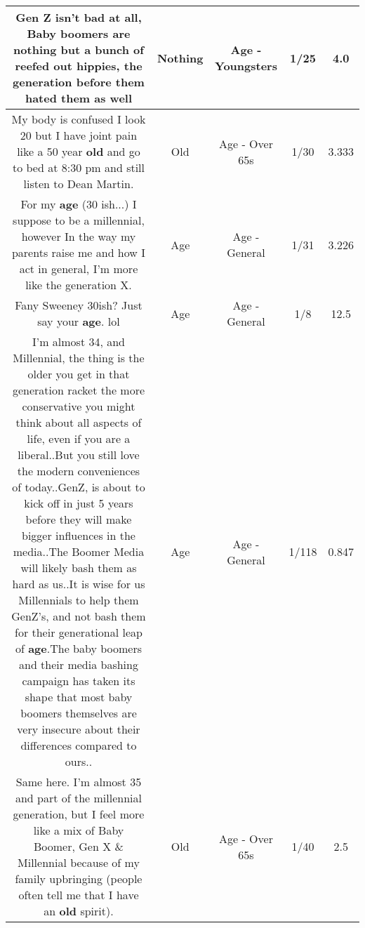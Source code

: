 \documentclass[11pt]{article}
\newlength\mylength
\begin{document}
\begin{center}
\begin{longtable}{|C{.65\mylength}|C{.30\mylength}|C{.12\mylength}|C{.12\mylength}|C{.12\mylength}|}
  \small Gen Z isn't bad at all, Baby boomers are \textbf{nothing} but a bunch of reefed out hippies, the generation before them hated them as well\normalsize   & Nothing & Age - Youngsters & 1/25 & 4.0 \\  \hline
  \small My body is confused I look 20 but I have joint pain like a 50 year \textbf{old} and go to bed at 8:30 pm and still listen to Dean Martin.\normalsize   & Old & Age - Over 65s & 1/30 & 3.333 \\  \hline
  \small For my \textbf{age} (30 ish...) I suppose to be a millennial, however In the way my parents raise me and how I act in general, I'm more like the generation X.\normalsize   & Age & Age - General & 1/31 & 3.226 \\  \hline
  \small Fany Sweeney 30ish? Just say your \textbf{age}. lol\normalsize   & Age & Age - General & 1/8 & 12.5 \\  \hline
  \small I'm almost 34, and Millennial, the thing is the older you get in that generation racket the more conservative you might think about all aspects of life, even if you are a liberal..But you still love the modern conveniences of today..GenZ, is about to kick off in just 5 years before they will make bigger influences in the media..The Boomer Media will likely bash them as hard as us..It is wise for us Millennials to help them GenZ's, and not bash them for their generational leap of \textbf{age}.The baby boomers and their media bashing campaign has taken its shape that most baby boomers themselves are very insecure about their differences compared to ours..\normalsize   & Age & Age - General & 1/118 & 0.847 \\  \hline
  \small Same here.  I'm almost 35 and part of the millennial generation, but I feel more like a mix of Baby Boomer, Gen X \& Millennial because of my family upbringing (people often tell me that I have an \textbf{old} spirit).\normalsize   & Old & Age - Over 65s & 1/40 & 2.5 \\  \hline

\end{longtable}
\end{center}
\end{document}
